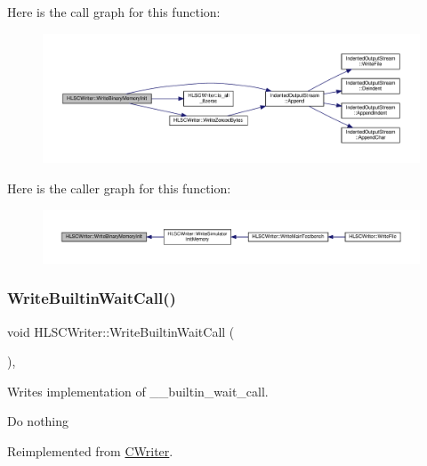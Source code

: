 Here is the call graph for this function\+:
\nopagebreak
\begin{figure}[H]
\begin{center}
\leavevmode
\includegraphics[width=350pt]{d4/db1/classHLSCWriter_a8fd01f9eda521085a428e6c46e4dc871_cgraph}
\end{center}
\end{figure}
Here is the caller graph for this function\+:
\nopagebreak
\begin{figure}[H]
\begin{center}
\leavevmode
\includegraphics[width=350pt]{d4/db1/classHLSCWriter_a8fd01f9eda521085a428e6c46e4dc871_icgraph}
\end{center}
\end{figure}
\mbox{\label{classHLSCWriter_a7261192f62610bd053e5c35361ae1054}} 
\subsubsection{\texorpdfstring{Write\+Builtin\+Wait\+Call()}{WriteBuiltinWaitCall()}}
{\footnotesize\ttfamily void H\+L\+S\+C\+Writer\+::\+Write\+Builtin\+Wait\+Call (\begin{DoxyParamCaption}{ }\end{DoxyParamCaption})\hspace{0.3cm}{\ttfamily [protected]}, {\ttfamily [virtual]}}



Writes implementation of \+\_\+\+\_\+builtin\+\_\+wait\+\_\+call. 

Do nothing 

Reimplemented from \hyperlink{classCWriter_ad3407e20cd7eb648efe844771d3fe80f}{C\+Writer}.



